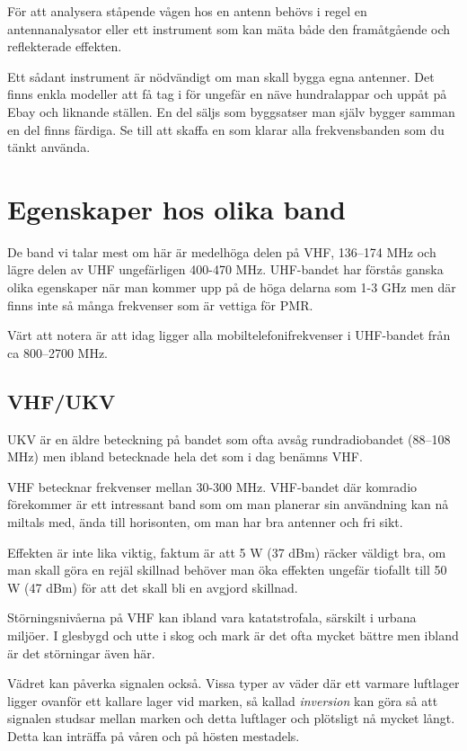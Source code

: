 \documentclass[12ypt,swedish,a4paper]{report}
\begin{document}
För att analysera ståpende vågen hos en antenn behövs i regel en antennanalysator eller ett instrument som kan mäta både den framåtgående och reflekterade effekten. 

Ett sådant instrument är nödvändigt om man skall bygga egna antenner. Det finns enkla modeller att få tag i för ungefär en näve hundralappar och uppåt på Ebay och liknande ställen. En del säljs som byggsatser man själv bygger samman en del finns färdiga. Se till att skaffa en som klarar alla frekvensbanden som du tänkt använda.


\section{Egenskaper hos olika band}

De band vi talar mest om här är medelhöga delen på VHF, 136--174 MHz och lägre delen av UHF ungefärligen 400-470 MHz. UHF-bandet har förstås ganska olika egenskaper när man kommer upp på de höga delarna som 1-3 GHz men där finns inte så många frekvenser som är vettiga för PMR.

Värt att notera är att idag ligger alla mobiltelefonifrekvenser i UHF-bandet från ca 800--2700 MHz.

\subsection{VHF/UKV}

UKV är en äldre beteckning på bandet som ofta avsåg rundradiobandet (88--108 MHz) men ibland betecknade hela det som i dag benämns VHF.

VHF betecknar frekvenser mellan 30-300 MHz. VHF-bandet där komradio förekommer är ett intressant band som om man planerar sin användning kan nå miltals med, ända till horisonten, om man har bra antenner och fri sikt. 

Effekten är inte lika viktig, faktum är att 5 W (37 dBm) räcker väldigt bra, om man skall göra en rejäl skillnad behöver man öka effekten ungefär tiofallt till 50 W (47 dBm) för att det skall bli en avgjord skillnad. 

Störningsnivåerna på VHF kan ibland vara katatstrofala, särskilt i urbana miljöer. I glesbygd och utte i skog och mark är det ofta mycket bättre men ibland är det störningar även här. 

Vädret kan påverka signalen också. Vissa typer av väder där ett varmare luftlager ligger ovanför ett kallare lager vid marken, så kallad \textit{inversion} kan göra så att signalen studsar mellan marken och detta luftlager och plötsligt nå mycket långt. Detta kan inträffa på våren och på hösten mestadels.
\end{document}
